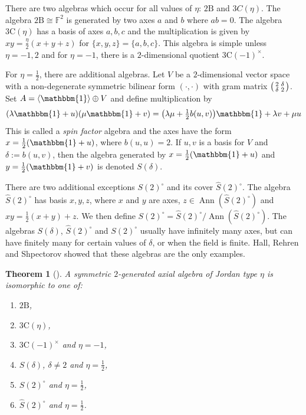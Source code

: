 \documentclass[11pt, a4paper]{article}
\theoremstyle{plain}
\newtheorem{theorem}{Theorem}[section]
\theoremstyle{definition}
\newcommand\dl{\delta}
\newcommand\lm{\lambda}
\newcommand\la{\langle}
\newcommand\ra{\rangle}
\DeclareMathOperator{\Ann}{Ann}
\newcommand\FF{\mathbb{F}}
\newcommand{\B}{\mathrm{B}}
\newcommand{\C}{\mathrm{C}}
\newcommand{\Cl}{\widehat{S}(2)^\circ} %
\newcommand{\0}{\overline{0}}
\newcommand{\2}{\overline{2}}
\newcommand{\1}{\mathbbm{1}}
\begin{document}
There are two algebras which occur for all values of $\eta$: $2\B$ and $3C(\eta)$.  The algebra $2\B \cong \FF^2$ is generated by two axes $a$ and $b$ where $ab = 0$.  The algebra $3\C(\eta)$ has a basis of axes $a,b,c$ and the multiplication is given by $xy = \frac{\eta}{2}(x+y+z)$ for $\{x,y,z\} = \{a,b,c\}$.  This algebra is simple unless $\eta = -1, 2$ and for $\eta = -1$, there is a $2$-dimensional quotient $3\C(-1)^\times$.

For $\eta = \frac{1}{2}$, there are additional algebras.  Let $V$ be a $2$-dimensional vector space with a non-degenerate symmetric bilinear form $(\cdot, \cdot)$ with gram matrix $\begin{psmallmatrix} 2 & \dl \\ \dl & 2 \end{psmallmatrix}$.  Set $A = \la \1 \ra \oplus V$ and define multiplication by
\[
(\lm \1 + u)(\mu \1 + v) = \big(\lm \mu + \tfrac{1}{2}b(u,v)\big)\1 + \lm v + \mu u
\]
This is called a \emph{spin factor} algebra and the axes have the form $x = \frac{1}{2}(\1 + u)$, where $b(u,u) = 2$.  If $u,v$ is a basis for $V$ and $\dl := b(u,v)$, then the algebra generated by $x=\frac{1}{2}(\1 + u)$ and $y=\frac{1}{2}(\1 + v)$ is denoted $S(\dl)$.

There are two additional exceptions $S(2)^\circ$ and its cover $\Cl$.  The algebra $\Cl$ has basis $x,y,z$, where $x$ and $y$ are axes, $z \in \Ann(\Cl)$ and $xy = \frac{1}{2}(x+y) + z$.  We then define $S(2)^\circ = \Cl/\Ann(\Cl)$.  The algebras $S(\dl)$, $\Cl$ and $S(2)^\circ$ usually have infinitely many axes, but can have finitely many for certain values of $\dl$, or when the field is finite.  Hall, Rehren and Shpectorov showed that these algebras are the only examples.

\begin{theorem}[\cite{Axial1}]\label{2gen jordan}
	A symmetric $2$-generated axial algebra of Jordan type $\eta$ is isomorphic to one of:
	\begin{enumerate}
		\item $2\B$,
		\item $3\C(\eta)$,
		\item $3\C(-1)^{\times}$ and $\eta = -1$,
		\item $S(\delta)$, $\delta \neq 2$ and $\eta = \tfrac{1}{2}$,
		\item $S(2)^\circ$ and $\eta = \tfrac{1}{2}$,
		\item $\Cl$ and $\eta = \tfrac{1}{2}$.
	\end{enumerate}
\end{theorem}
\end{document}
